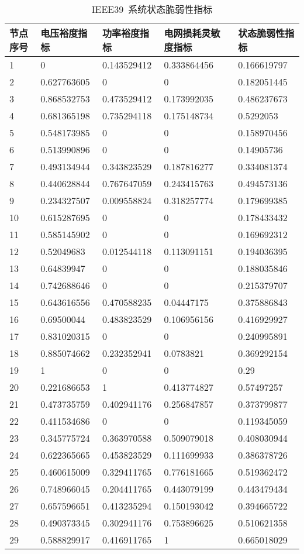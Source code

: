 \begin{table}[H]
  \centering
  \caption{IEEE39~系统状态脆弱性指标}
  \label{tab:chap5:Index1_frabric39}
  \begin{tabular}{C{1.5cm}C{2.75cm}C{2.75cm}C{3.25cm}C{2.75cm}}
  \toprule
  \textbf{节点序号} & \textbf{电压裕度指标} & \textbf{功率裕度指标} & \textbf{电网损耗灵敏度指标} & \textbf{状态脆弱性指标} \\
   & 0 & 0.143529412 & 0.333864456 & 0.166619797 \\ 
  2 & 0.627763605 & 0 & 0 & 0.182051445 \\ 
  3 & 0.868532753 & 0.473529412 & 0.173992035 & 0.486237673 \\ 
  4 & 0.681365198 & 0.735294118 & 0.175148734 & 0.5292053 \\ 
  5 & 0.548173985 & 0 & 0 & 0.158970456 \\ 
  6 & 0.513990896 & 0 & 0 & 0.14905736 \\ 
  7 & 0.493134944 & 0.343823529 & 0.187816277 & 0.334081374 \\ 
  8 & 0.440628844 & 0.767647059 & 0.243415763 & 0.494573136 \\ 
  9 & 0.234327507 & 0.009558824 & 0.318257774 & 0.179699385 \\ 
  10 & 0.615287695 & 0 & 0 & 0.178433432 \\ 
  11 & 0.585145902 & 0 & 0 & 0.169692312 \\ 
  12 & 0.52049683 & 0.012544118 & 0.113091151 & 0.194036395 \\
  13 & 0.64839947 & 0 & 0 & 0.188035846 \\ 
  14 & 0.742688646 & 0 & 0 & 0.215379707 \\
  15 & 0.643616556 & 0.470588235 & 0.04447175 & 0.375886843 \\ 
  16 & 0.69500044 & 0.483823529 & 0.106956156 & 0.416929927 \\ 
  17 & 0.831020315 & 0 & 0 & 0.240995891 \\
  18 & 0.885074662 & 0.232352941 & 0.0783821 & 0.369292154 \\ 
  19 & 1 & 0 & 0 & 0.29 \\ 
  20 & 0.221686653 & 1 & 0.413774827 & 0.57497257 \\ 
  21 & 0.473735759 & 0.402941176 & 0.256847857 & 0.373799877 \\ 
  22 & 0.411534686 & 0 & 0 & 0.119345059 \\ 
  23 & 0.345775724 & 0.363970588 & 0.509079018 & 0.408030944 \\ 
  24 & 0.622365665 & 0.453823529 & 0.111699933 & 0.386378726 \\ 
  25 & 0.460615009 & 0.329411765 & 0.776181665 & 0.519362472 \\ 
  26 & 0.748966045 & 0.204411765 & 0.443079199 & 0.443479434 \\ 
  27 & 0.657596651 & 0.413235294 & 0.150193042 & 0.394665722 \\ 
  28 & 0.490373345 & 0.302941176 & 0.753896625 & 0.510621358 \\ 
  29 & 0.588829917 & 0.416911765 & 1 & 0.665018029 \\ 
  \bottomrule
  \end{tabular}
\end{table}

